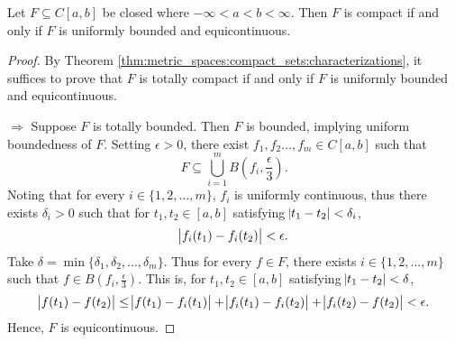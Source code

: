 \begin{thm}
Let $F \subseteq C[a, b]$ be closed where $-\infty < a < b < \infty$. 
Then $F$ is compact if and only if $F$ is uniformly bounded and 
equicontinuous. 
\end{thm}
\begin{proof}
By Theorem \ref{thm:metric_spaces:compact_sets:characterizations}, it 
suffices to prove that $F$ is totally compact if and only if $F$ is 
uniformly bounded and equicontinuous. 

$\Rightarrow$
Suppose $F$ is totally bounded. 
Then $F$ is bounded, implying uniform boundedness of $F$. 
Setting $\epsilon > 0$, there exist $f_1, f_2 \ldots, f_m \in C[a, b]$ 
such that 
\begin{equation*}
    F \subseteq \bigcup_{i=1}^m B(f_i, \frac{\epsilon}{3}). 
\end{equation*}
Noting that for every $i \in \{1, 2, \ldots, m\}$, $f_i$ is uniformly 
continuous, thus there exists $\delta_i > 0$ such that for $t_1, t_2 \in 
[a, b]$ satisfying $\abs{t_1 - t_2} < \delta_i$, 
\begin{equation*}
    \abs{f_i(t_1) - f_i(t_2)} < \epsilon. 
\end{equation*}
Take $\delta = \min \{\delta_1, \delta_2, \ldots, \delta_m\}$. 
Thus for every $f \in F$, there exists $i \in \{1, 2, \ldots, m\}$ 
such that $f \in B(f_i, \frac{\epsilon}{3})$. 
This is, for $t_1, t_2 \in [a, b]$ satisfying $\abs{t_1 - t_2} < \delta$, 
\begin{equation*}
    \abs{f(t_1) - f(t_2)} \le \abs{f(t_1) - f_i(t_1)} 
    + \abs{f_i(t_1) - f_i(t_2)} + \abs{f_i(t_2) - f(t_2)} < \epsilon. 
\end{equation*}
Hence, $F$ is equicontinuous. 


\end{proof}
